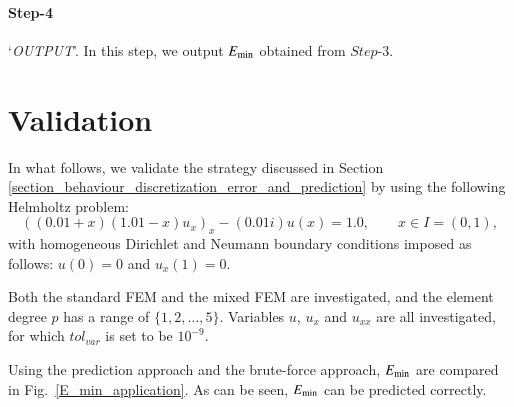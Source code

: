 \documentclass[review,3p]{elsarticle}
\begin{document}
\paragraph{Step-4} `\textit{OUTPUT}'. In this step, we output $E_{\rm min}$ obtained from $Step$-3.

\section{Validation}		\label{section_validation}

In what follows, we validate the strategy discussed in Section \ref{section_behaviour_discretization_error_and_prediction} by using the following Helmholtz problem:
\begin{equation}
  \left((0.01+x)(1.01-x) u_x \right)_x -(0.01i) u(x) = 1.0,\qquad x \in I = (0,1),	\label{1D_Helmholtz_equation_application}
\end{equation}
with homogeneous Dirichlet and Neumann boundary conditions imposed as follows: $u(0)=0$ and $u_x(1)=0$.

Both the standard FEM and the mixed FEM are investigated, and the element degree $p$ has a range of $\{1, 2, \ldots, 5\}$. Variables $u$, $u_x$ and $u_{xx}$ are all investigated, for which $tol_{var}$ is set to be $10^{-9}$. 

Using the prediction approach and the brute-force approach, $E_{\rm min}$ are compared in Fig.~\ref{E_min_application}. As can be seen, $E_{\rm min}$ can be predicted correctly.
\end{document}
